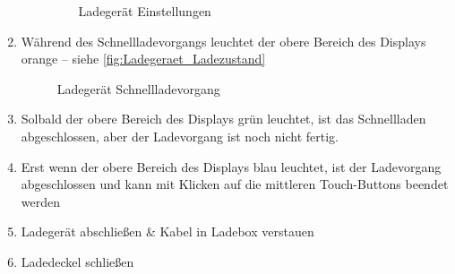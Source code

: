 \begin{enumerate}
\begin{enumerate}
\begin{figure}[H]
            \centering
            \caption{Ladegerät Einstellungen \label{fig:Ladegeraet_Menueanzeige2}}
        \end{figure}
    \end{enumerate}
    \newpage
    \item Während des Schnellladevorgangs leuchtet der obere Bereich des Displays orange -- siehe \autoref{fig:Ladegeraet_Ladezustand}
    \begin{figure}[H]
        \centering
        \caption{Ladegerät Schnellladevorgang \label{fig:Ladegeraet_Ladezustand}}
    \end{figure}
    \item Solbald der obere Bereich des Displays grün leuchtet, ist das Schnellladen abgeschlossen, aber der Ladevorgang ist noch nicht fertig.
    \item Erst wenn der obere Bereich des Displays blau leuchtet, ist der Ladevorgang abgeschlossen und kann mit Klicken auf die mittleren Touch-Buttons beendet werden
    \item Ladegerät abschließen \& Kabel in Ladebox verstauen
    \item Ladedeckel schließen
\end{enumerate}

